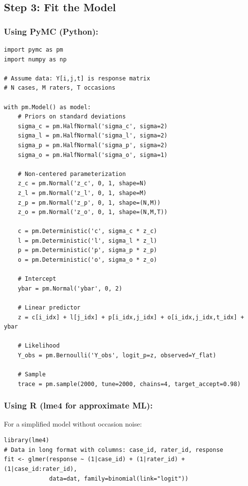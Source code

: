\subsection*{Step 3: Fit the Model}

\subsubsection*{Using PyMC (Python):}
\begin{verbatim}
import pymc as pm
import numpy as np

# Assume data: Y[i,j,t] is response matrix
# N cases, M raters, T occasions

with pm.Model() as model:
    # Priors on standard deviations
    sigma_c = pm.HalfNormal('sigma_c', sigma=2)
    sigma_l = pm.HalfNormal('sigma_l', sigma=2)
    sigma_p = pm.HalfNormal('sigma_p', sigma=2)
    sigma_o = pm.HalfNormal('sigma_o', sigma=1)

    # Non-centered parameterization
    z_c = pm.Normal('z_c', 0, 1, shape=N)
    z_l = pm.Normal('z_l', 0, 1, shape=M)
    z_p = pm.Normal('z_p', 0, 1, shape=(N,M))
    z_o = pm.Normal('z_o', 0, 1, shape=(N,M,T))

    c = pm.Deterministic('c', sigma_c * z_c)
    l = pm.Deterministic('l', sigma_l * z_l)
    p = pm.Deterministic('p', sigma_p * z_p)
    o = pm.Deterministic('o', sigma_o * z_o)

    # Intercept
    ybar = pm.Normal('ybar', 0, 2)

    # Linear predictor
    z = c[i_idx] + l[j_idx] + p[i_idx,j_idx] + o[i_idx,j_idx,t_idx] + ybar

    # Likelihood
    Y_obs = pm.Bernoulli('Y_obs', logit_p=z, observed=Y_flat)

    # Sample
    trace = pm.sample(2000, tune=2000, chains=4, target_accept=0.98)
\end{verbatim}

\subsubsection*{Using R (lme4 for approximate ML):}
For a simplified model without occasion noise:
\begin{verbatim}
library(lme4)
# Data in long format with columns: case_id, rater_id, response
fit <- glmer(response ~ (1|case_id) + (1|rater_id) + (1|case_id:rater_id),
             data=dat, family=binomial(link="logit"))
\end{verbatim}

